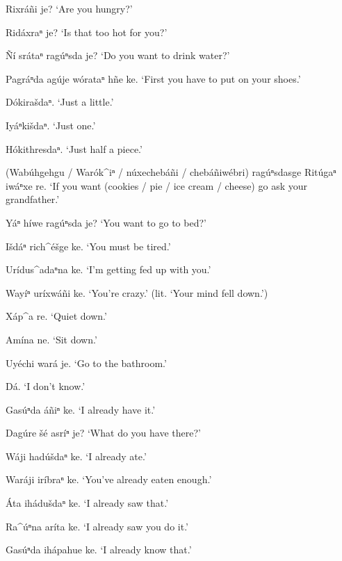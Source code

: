 \documentclass[output=paper]{LSP/langsci}
\begin{document}
\begin{list}{}{} \itemsep1pt \parskip0pt 

\item{Rixráñi je? `Are you hungry?'}
\item{Ridáxraⁿ je? `Is that too hot for you?'}
\item{\~Ní srátaⁿ ragúⁿsda je? `Do you want to drink water?'}
\item{Pagráⁿda agúje wórataⁿ hñe ke. `First you have to put on your shoes.'}
\item{Dókirašdaⁿ.	`Just a little.'}
\item{}
\item{Iyáⁿkišdaⁿ. `Just one.'}
\item{Hókithre{s}daⁿ. `Just half a piece.'}
\item{(Wabúhgehgu / Warók\^{ }iⁿ / núxechebáñi / chebáñiwébri) ragúⁿsdasge Ritúgaⁿ iwáⁿxe re. `If you want (cookies / pie / ice cream / cheese) go ask your grandfather.'}
\item{Yáⁿ híwe ragúⁿsda je? `You want to go to bed?'}
\item{Išdáⁿ rich\^{ }éšge ke. `You must be tired.'}
\item{}
\item{Urídus\^{ }adaⁿna ke. `I'm getting fed up with you.'}
\item{Wayíⁿ uríxwáñi ke. `You're crazy.' (lit. `Your mind fell down.')}
\item{Xáp\^{ }a re. `Quiet down.'}
\item{Amína ne. `Sit down.'	}
\item{Uyéchi wará je. `Go to the bathroom.'}
\item{}
\item{Dá.	`I don't know.'}
\item{Gasúⁿda áñiⁿ ke.	`I already have it.'}
\item{Dagúre šé asríⁿ je?	 `What do you have there?'}
\item{Wáji hadúšdaⁿ ke. `I already ate.'}
\item{Waráji iríbraⁿ ke. `You've already eaten enough.'}
\item{}
\item{\'Ata ihádušdaⁿ ke.	`I already saw that.'}
\item{Ra\^{ }úⁿna aríta ke.	`I already saw you do it.'}
\item{Gasúⁿda ihápahue ke.	 `I already know that.'}
\item{}
\end{list} 
\end{document}
